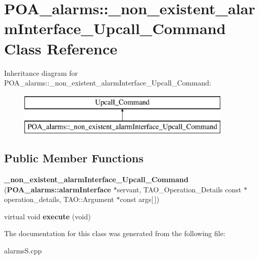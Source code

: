 \section{P\+O\+A\+\_\+alarms\+:\+:\+\_\+non\+\_\+existent\+\_\+alarm\+Interface\+\_\+\+Upcall\+\_\+\+Command Class Reference}
\label{classPOA__alarms_1_1__non__existent__alarmInterface__Upcall__Command}
Inheritance diagram for P\+O\+A\+\_\+alarms\+:\+:\+\_\+non\+\_\+existent\+\_\+alarm\+Interface\+\_\+\+Upcall\+\_\+\+Command\+:\begin{figure}[H]
\begin{center}
\leavevmode
\includegraphics[height=2.000000cm]{classPOA__alarms_1_1__non__existent__alarmInterface__Upcall__Command}
\end{center}
\end{figure}
\subsection*{Public Member Functions}
\begin{DoxyCompactItemize}
\item 
{\bfseries \+\_\+non\+\_\+existent\+\_\+alarm\+Interface\+\_\+\+Upcall\+\_\+\+Command} ({\bf P\+O\+A\+\_\+alarms\+::alarm\+Interface} $\ast$servant, T\+A\+O\+\_\+\+Operation\+\_\+\+Details const $\ast$operation\+\_\+details, T\+A\+O\+::\+Argument $\ast$const args[$\,$])\label{classPOA__alarms_1_1__non__existent__alarmInterface__Upcall__Command_ad3d9b4082485a85c8c2733d30d6c661d}

\item 
virtual void {\bfseries execute} (void)\label{classPOA__alarms_1_1__non__existent__alarmInterface__Upcall__Command_a6f6da3e8ac88d0ee7b1950e75fb0ccb9}

\end{DoxyCompactItemize}


The documentation for this class was generated from the following file\+:\begin{DoxyCompactItemize}
\item 
alarms\+S.\+cpp\end{DoxyCompactItemize}
